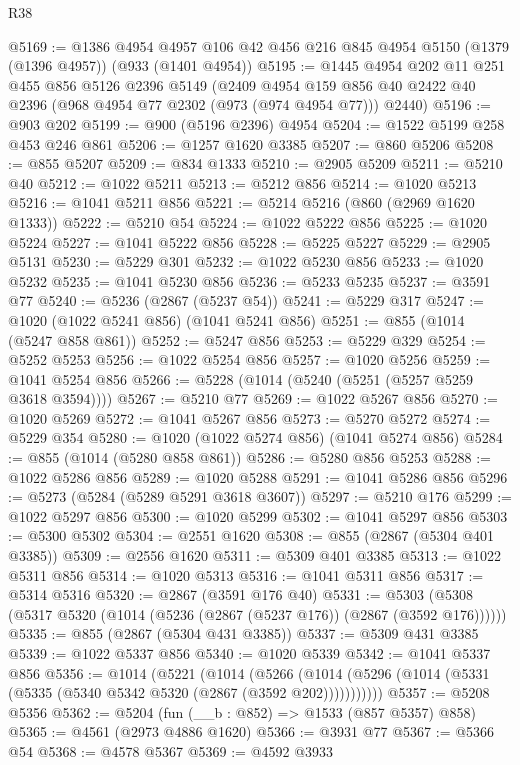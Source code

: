 \begin{lexlean}{R38}
\begin{coremodule}
@5169 := @1386
    @4954
    @4957
    @106
    @42
    @456
    @216
    @845
    @4954
    @5150
    (@1379 (@1396 @4957))
    (@933 (@1401 @4954))
@5195 := @1445
    @4954
    @202
    @11
    @251
    @455
    @856
    @5126
    @2396
    @5149
    (@2409 @4954 @159 @856 @40 @2422 @40 @2396 (@968 @4954 @77 @2302 (@973 (@974 @4954 @77))) @2440)
@5196 := @903 @202
@5199 := @900 (@5196 @2396) @4954
@5204 := @1522 @5199 @258 @453 @246 @861
@5206 := @1257 @1620 @3385
@5207 := @860 @5206
@5208 := @855 @5207
@5209 := @834 @1333
@5210 := @2905 @5209
@5211 := @5210 @40
@5212 := @1022 @5211
@5213 := @5212 @856
@5214 := @1020 @5213
@5216 := @1041 @5211 @856
@5221 := @5214 @5216 (@860 (@2969 @1620 @1333))
@5222 := @5210 @54
@5224 := @1022 @5222 @856
@5225 := @1020 @5224
@5227 := @1041 @5222 @856
@5228 := @5225 @5227
@5229 := @2905 @5131
@5230 := @5229 @301
@5232 := @1022 @5230 @856
@5233 := @1020 @5232
@5235 := @1041 @5230 @856
@5236 := @5233 @5235
@5237 := @3591 @77
@5240 := @5236 (@2867 (@5237 @54))
@5241 := @5229 @317
@5247 := @1020 (@1022 @5241 @856) (@1041 @5241 @856)
@5251 := @855 (@1014 (@5247 @858 @861))
@5252 := @5247 @856
@5253 := @5229 @329
@5254 := @5252 @5253
@5256 := @1022 @5254 @856
@5257 := @1020 @5256
@5259 := @1041 @5254 @856
@5266 := @5228 (@1014 (@5240 (@5251 (@5257 @5259 @3618 @3594))))
@5267 := @5210 @77
@5269 := @1022 @5267 @856
@5270 := @1020 @5269
@5272 := @1041 @5267 @856
@5273 := @5270 @5272
@5274 := @5229 @354
@5280 := @1020 (@1022 @5274 @856) (@1041 @5274 @856)
@5284 := @855 (@1014 (@5280 @858 @861))
@5286 := @5280 @856 @5253
@5288 := @1022 @5286 @856
@5289 := @1020 @5288
@5291 := @1041 @5286 @856
@5296 := @5273 (@5284 (@5289 @5291 @3618 @3607))
@5297 := @5210 @176
@5299 := @1022 @5297 @856
@5300 := @1020 @5299
@5302 := @1041 @5297 @856
@5303 := @5300 @5302
@5304 := @2551 @1620
@5308 := @855 (@2867 (@5304 @401 @3385))
@5309 := @2556 @1620
@5311 := @5309 @401 @3385
@5313 := @1022 @5311 @856
@5314 := @1020 @5313
@5316 := @1041 @5311 @856
@5317 := @5314 @5316
@5320 := @2867 (@3591 @176 @40)
@5331 := @5303 (@5308 (@5317 @5320 (@1014 (@5236 (@2867 (@5237 @176)) (@2867 (@3592 @176))))))
@5335 := @855 (@2867 (@5304 @431 @3385))
@5337 := @5309 @431 @3385
@5339 := @1022 @5337 @856
@5340 := @1020 @5339
@5342 := @1041 @5337 @856
@5356 := @1014
    (@5221
      (@1014
        (@5266 (@1014 (@5296 (@1014 (@5331 (@5335 (@5340 @5342 @5320 (@2867 (@3592 @202)))))))))))
@5357 := @5208 @5356
@5362 := @5204 (fun (__b : @852) => @1533 (@857 @5357) @858)
@5365 := @4561 (@2973 @4886 @1620)
@5366 := @3931 @77
@5367 := @5366 @54
@5368 := @4578 @5367
@5369 := @4592 @3933

\end{coremodule}
\end{lexlean}

